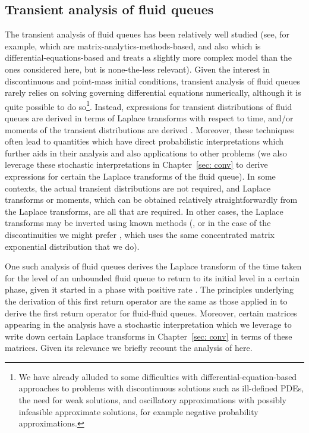 \subsection{Transient analysis of fluid queues}\label{sec: transient ffq intro}
The transient analysis of fluid queues has been relatively well studied (see, for example, \cite{ar2004,bean2005,dasilva2005,bean2009} which are matrix-analytics-methods-based, and also \cite{rs2003} which is differential-equations-based and treats a slightly more complex model than the ones considered here, but is none-the-less relevant). Given the interest in discontinuous and point-mass initial conditions, transient analysis of fluid queues rarely relies on solving governing differential equations numerically, although it is quite possible to do so\footnote{We have already alluded to some difficulties with differential-equation-based approaches to problems with discontinuous solutions such as ill-defined PDEs, the need for weak solutions, and oscillatory approximations with possibly infeasible approximate solutions, for example negative probability approximations.}. Instead, expressions for transient distributions of fluid queues are derived in terms of Laplace transforms with respect to time, and/or moments of the transient distributions are derived \citep{ar2004,bean2005,bean2009}. Moreover, these techniques often lead to quantities which have direct probabilistic interpretations which further aids in their analysis and also applications to other problems \citep{ar2003,dasilva2005,bnp2018} (we also leverage these stochastic interpretations in Chapter~\ref{sec: conv} to derive expressions for certain the Laplace transforms of the fluid queue). In some contexts, the actual transient distributions are not required, and Laplace transforms or moments, which can be obtained relatively straightforwardly from the Laplace transforms, are all that are required. In other cases, the Laplace transforms may be inverted using known methods (\cite{aw2006}, or in the case of the discontinuities we might prefer \cite{hhat2020}, which uses the same concentrated matrix exponential distribution that we do).

One such analysis of fluid queues derives the Laplace transform of the time taken for the level of an unbounded fluid queue to return to its initial level in a certain phase, given it started in a phase with positive rate \citep{bean2005}. The principles underlying the derivation of this first return operator are the same as those applied in \cite{bo2014} to derive the first return operator for fluid-fluid queues. Moreover, certain matrices appearing in the analysis have a stochastic interpretation which we leverage to write down certain Laplace transforms in Chapter~\ref{sec: conv} in terms of these matrices. Given its relevance we briefly recount the analysis of \cite{bean2005} here. 

